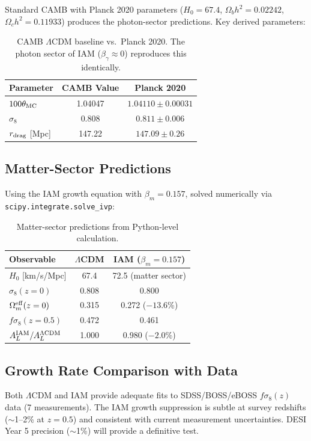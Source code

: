 \documentclass[11pt,letterpaper]{article}
\begin{document}
Standard CAMB with Planck 2020 parameters ($H_0 = 67.4$, $\Omega_b h^2 = 0.02242$, $\Omega_c h^2 = 0.11933$) produces the photon-sector predictions. Key derived parameters:

\begin{table}[h]
\centering
\begin{tabular}{lcc}
\toprule
Parameter & CAMB Value & Planck 2020 \\
\midrule
$100\theta_{\rm MC}$ & 1.04047 & $1.04110 \pm 0.00031$ \\
$\sigma_8$ & 0.808 & $0.811 \pm 0.006$ \\
$r_{\rm drag}$ [Mpc] & 147.22 & $147.09 \pm 0.26$ \\
\bottomrule
\end{tabular}
\caption{CAMB $\Lambda$CDM baseline vs.\ Planck 2020. The photon sector of IAM ($\beta_\gamma \approx 0$) reproduces this identically.}
\end{table}

\subsection{Matter-Sector Predictions}

Using the IAM growth equation with $\beta_m = 0.157$, solved numerically via \texttt{scipy.integrate.solve\_ivp}:

\begin{table}[h]
\centering
\begin{tabular}{lcc}
\toprule
Observable & $\Lambda$CDM & IAM ($\beta_m = 0.157$) \\
\midrule
$H_0$ [km/s/Mpc] & 67.4 & 72.5 (matter sector) \\
$\sigma_8(z=0)$ & 0.808 & 0.800 \\
$\Omega_m^{\rm eff}(z=0)$ & 0.315 & 0.272 ($-13.6$\%) \\
$f\sigma_8(z=0.5)$ & 0.472 & 0.461 \\
$A_L^{\rm IAM}/A_L^{\Lambda\rm CDM}$ & 1.000 & 0.980 ($-2.0$\%) \\
\bottomrule
\end{tabular}
\caption{Matter-sector predictions from Python-level calculation.}
\end{table}

\subsection{Growth Rate Comparison with Data}

Both $\Lambda$CDM and IAM provide adequate fits to SDSS/BOSS/eBOSS $f\sigma_8(z)$ data (7 measurements). The IAM growth suppression is subtle at survey redshifts ($\sim$1--2\% at $z = 0.5$) and consistent with current measurement uncertainties. DESI Year 5 precision ($\sim$1\%) will provide a definitive test.
\end{document}

